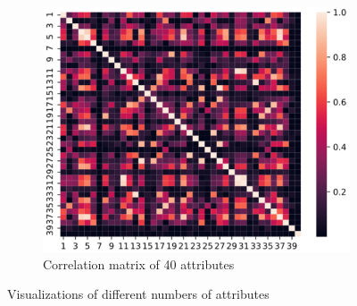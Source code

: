 \begin{figure}[h]
\hfill
\begin{subfigure}[b]{0.3\textwidth}
	\centering
	\includegraphics[width=\textwidth]{pictures/bioliq40}
	\caption{Correlation matrix of 40 attributes}
	\label{fig:matrix40}
\end{subfigure}
	\caption{Visualizations of different numbers of attributes}
	\label{fig:visualization}
\end{figure}
